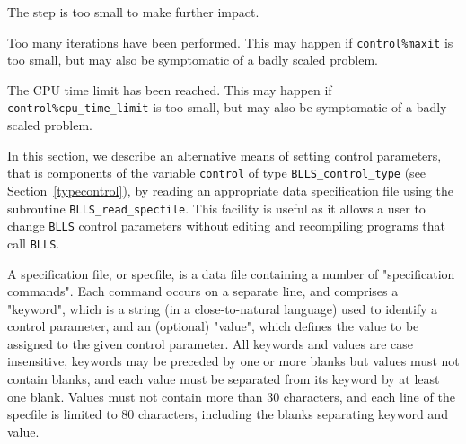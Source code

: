 \documentclass{galahad}
\newcommand{\packagename}{BLLS}
\begin{document}
\begin{description}
 The step is too small to make further impact.

 Too many iterations have been performed.
   This may happen if
    {\tt control\%maxit} is too small, but may also be symptomatic of
    a badly scaled problem.

 The CPU time limit has been reached. This may happen if
    {\tt control\%cpu\_time\_limit} is too small, but may also be symptomatic
    of a badly scaled problem.


\end{description}


\galfeatures
\noindent In this section, we describe an alternative means of setting
control parameters, that is components of the variable {\tt control} of type
{\tt \packagename\_control\_type}
(see Section~\ref{typecontrol}),
by reading an appropriate data specification file using the
subroutine {\tt \packagename\_read\_specfile}. This facility
is useful as it allows a user to change  {\tt \packagename} control parameters
without editing and recompiling programs that call {\tt \packagename}.

A specification file, or specfile, is a data file containing a number of
"specification commands". Each command occurs on a separate line,
and comprises a "keyword",
which is a string (in a close-to-natural language) used to identify a
control parameter, and
an (optional) "value", which defines the value to be assigned to the given
control parameter. All keywords and values are case insensitive,
keywords may be preceded by one or more blanks but
values must not contain blanks, and
each value must be separated from its keyword by at least one blank.
Values must not contain more than 30 characters, and
each line of the specfile is limited to 80 characters,
including the blanks separating keyword and value.
\end{document}
